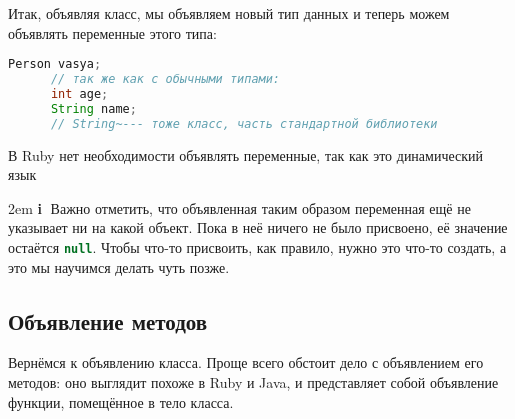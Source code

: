 \documentclass[a4paper, 14pt, titlepage]{extarticle}
\newenvironment{indented}%
    { \begingroup %
        \noindent %
        \leftskip2em %
        \rightskip\leftskip }%
    { \par\endgroup }
\newenvironment{extrainfo}%
    { \begin{indented} %
        \small %
        \textbf{\textcircled{\footnotesize i}} }%
    { \end{indented} }
\newenvironment{halfpage}%
    {\noindent\begin{minipage}[h]{0.49\linewidth}} %
    {\end{minipage}\hfill}
\newcommand{\inlinecode}[2][Java]{\lstinline[basicstyle=\ttfamily, language=#1]{#2}}
\begin{document}
  Итак, объявляя класс, мы объявляем новый тип данных и теперь можем объявлять переменные этого типа:

  \begin{halfpage}
    \begin{lstlisting}[language=Java, title={Переменные в Java}, gobble=6, texcl]
      Person vasya;
      // так же как с обычными типами:
      int age;
      String name;
      // String~--- тоже класс, часть стандартной библиотеки
    \end{lstlisting}
  \end{halfpage}
  \begin{halfpage}
    \vskip 5mm
    В Ruby нет необходимости объявлять
    переменные, так как это динамический язык
  \end{halfpage}

  \begin{extrainfo}
    Важно отметить, что объявленная таким образом переменная ещё не указывает ни на какой объект. Пока
    в неё ничего не было присвоено, её значение остаётся \inlinecode[Java]{null}. Чтобы что-то
    присвоить, как правило, нужно это что-то создать, а это мы научимся делать чуть позже.
  \end{extrainfo}

  \subsection{Объявление методов}

  Вернёмся к объявлению класса. Проще всего обстоит дело с объявлением его методов: оно выглядит
  похоже в Ruby и Java, и представляет собой объявление функции, помещённое в тело класса.
\end{document}
